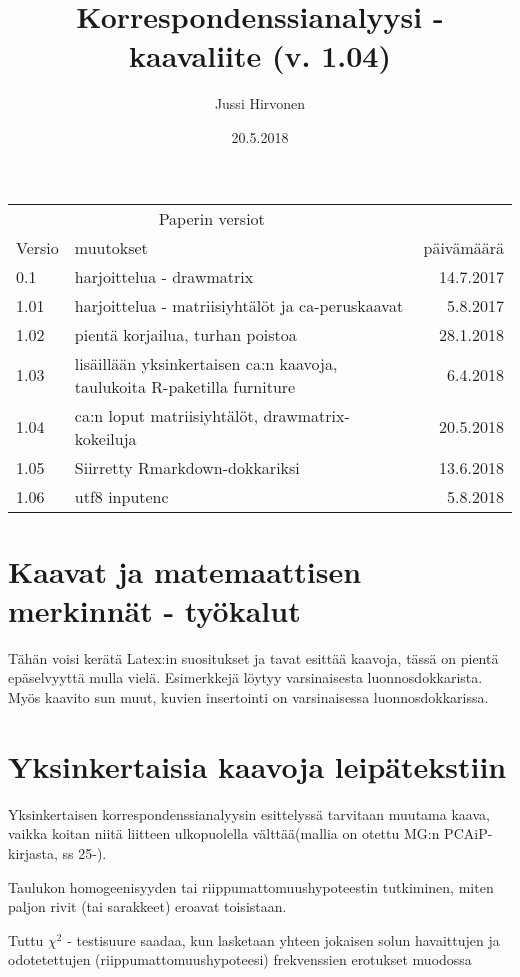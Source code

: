 \documentclass[12pt,a4paper,leqno]{article}
\title{Korrespondenssianalyysi - kaavaliite (v. 1.04)}
\author{Jussi Hirvonen}
\date{20.5.2018}
\theoremstyle{plain}
\theoremstyle{definition}
\theoremstyle{remark}
\begin{document}
\maketitle
\begin{tabular}{llr}
\hline
\multicolumn{2}{c}{Paperin versiot} \\
\cline{1-2}
Versio    & muutokset & päivämäärä  \\
\hline
0.1      	& harjoittelua - drawmatrix    & 14.7.2017     \\
1.01        	& harjoittelua - matriisiyhtälöt ja ca-peruskaavat& 5.8.2017       \\
1.02        	& pientä korjailua, turhan poistoa	& 28.1.2018       \\
1.03        	& lisäillään yksinkertaisen ca:n kaavoja, taulukoita R-paketilla furniture	& 6.4.2018 \\
1.04       	& ca:n loput matriisiyhtälöt, drawmatrix-kokeiluja 	& 20.5.2018\\
1.05          & Siirretty Rmarkdown-dokkariksi  & 13.6.2018\\
1.06		& utf8 inputenc					  &	  5.8.2018\\
\hline
\end{tabular}

\tableofcontents

\section{Kaavat ja matemaattisen merkinnät - työkalut}\label{johd}
Tähän voisi kerätä Latex:in suositukset ja tavat esittää kaavoja, tässä on pientä epäselvyyttä mulla vielä. Esimerkkejä löytyy varsinaisesta luonnosdokkarista. Myös kaavito sun muut, kuvien insertointi on varsinaisessa luonnosdokkarissa.

\section{Yksinkertaisia kaavoja leipätekstiin}\label{simppelit}

Yksinkertaisen korrespondenssianalyysin esittelyssä tarvitaan muutama kaava, vaikka koitan niitä liitteen ulkopuolella välttää(mallia on otettu MG:n PCAiP-kirjasta, ss 25-).

Taulukon homogeenisyyden tai riippumattomuushypoteestin tutkiminen, miten paljon rivit (tai sarakkeet) eroavat toisistaan.

Tuttu $\chi^{2}$ - testisuure saadaa, kun lasketaan yhteen jokaisen solun havaittujen ja odotetettujen (riippumattomuushypoteesi) frekvenssien erotukset muodossa
\end{document}

